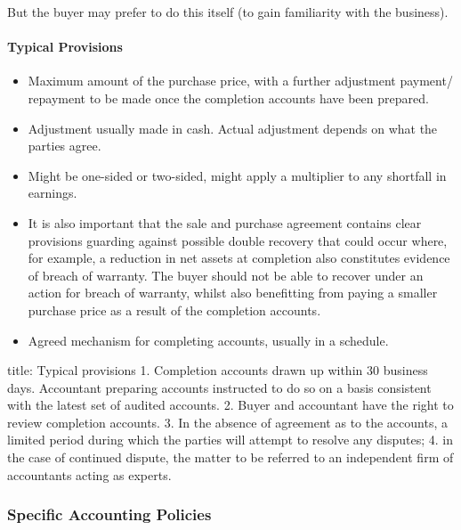 \documentclass[
]{article}
\newenvironment{Shaded}{}{}
\newcommand{\NormalTok}[1]{#1}
\providecommand{\tightlist}{%
  \setlength{\itemsep}{0pt}\setlength{\parskip}{0pt}}
\begin{document}
But the buyer may prefer to do this itself (to gain familiarity with the
business).

\hypertarget{typical-provisions}{%
\paragraph{Typical Provisions}\label{typical-provisions}}

\begin{itemize}
\tightlist
\item
  Maximum amount of the purchase price, with a further adjustment
  payment/ repayment to be made once the completion accounts have been
  prepared.
\item
  Adjustment usually made in cash. Actual adjustment depends on what the
  parties agree.
\item
  Might be one-sided or two-sided, might apply a multiplier to any
  shortfall in earnings.
\item
  It is also important that the sale and purchase agreement contains
  clear provisions guarding against possible double recovery that could
  occur where, for example, a reduction in net assets at completion also
  constitutes evidence of breach of warranty. The buyer should not be
  able to recover under an action for breach of warranty, whilst also
  benefitting from paying a smaller purchase price as a result of the
  completion accounts.
\item
  Agreed mechanism for completing accounts, usually in a schedule.
\end{itemize}

\begin{Shaded}
\begin{Highlighting}[]
\NormalTok{title: Typical provisions}
\NormalTok{1. Completion accounts drawn up within 30 business days. Accountant preparing accounts instructed to do so on a basis consistent with the latest set of audited accounts. }
\NormalTok{2. Buyer and accountant have the right to review completion accounts. }
\NormalTok{3. In the absence of agreement as to the accounts, a limited period during which the parties will attempt to resolve any disputes;}
\NormalTok{4. in the case of continued dispute, the matter to be referred to an independent firm of accountants acting as experts. }
\end{Highlighting}
\end{Shaded}

\hypertarget{specific-accounting-policies}{%
\subsubsection{Specific Accounting
Policies}\label{specific-accounting-policies}}
\end{document}
